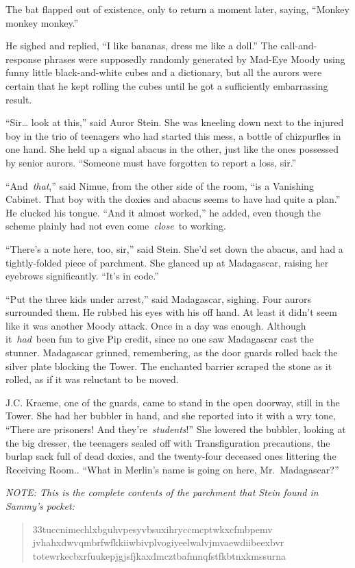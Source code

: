 The bat flapped out of existence, only to return a moment later, saying,
``Monkey monkey monkey.''

He sighed and replied, ``I like bananas, dress me like a doll.'' The
call-and-response phrases were supposedly randomly generated by Mad-Eye
Moody using funny little black-and-white cubes and a dictionary, but all
the aurors were certain that he kept rolling the cubes until he got a
sufficiently embarrassing result.

``Sir\ldots{} look at this,'' said Auror Stein. She was kneeling down
next to the injured boy in the trio of teenagers who had started this
mess, a bottle of chizpurfles in one hand. She held up a signal abacus
in the other, just like the ones possessed by senior aurors. ``Someone
must have forgotten to report a loss, sir.''

``And~\emph{that},'' said Nimue, from the other side of the room, ``is a
Vanishing Cabinet. That boy with the doxies and abacus seems to have had
quite a plan.'' He clucked his tongue. ``And it almost worked,'' he
added, even though the scheme plainly had not even come~\emph{close}~to
working.

``There's a note here, too, sir,'' said Stein. She'd set down the
abacus, and had a tightly-folded piece of parchment. She glanced up at
Madagascar, raising her eyebrows significantly. ``It's in code.''

``Put the three kids under arrest,'' said Madagascar, sighing. Four
aurors surrounded them. He rubbed his eyes with his off hand. At least
it didn't seem like it was another Moody attack. Once in a day was
enough. Although it~\emph{had}~been fun to give Pip credit, since no one
saw Madagascar cast the stunner. Madagascar grinned, remembering, as the
door guards rolled back the silver plate blocking the Tower. The
enchanted barrier scraped the stone as it rolled, as if it was reluctant
to be moved.

J.C. Kraeme, one of the guards, came to stand in the open doorway, still
in the Tower. She had her bubbler in hand, and she reported into it with
a wry tone, ``There are prisoners! And they're~\emph{students}!'' She
lowered the bubbler, looking at the big dresser, the teenagers sealed
off with Transfiguration precautions, the burlap sack full of dead
doxies, and the twenty-four deceased ones littering the Receiving Room..
``What in Merlin's name is going on here, Mr.~Madagascar?''

\mybreak

\emph{NOTE: This is the complete contents of the parchment that Stein
found in Sammy's pocket:}\\

\begin{quote}
\noindent 33tuccnimechlxbguhvpesyvbsuxihryccmcptwkxcfmbpemv
jvhahxdwvqmbrfwfkkiiwbivplvogiyeelwalvjmvaewdiibeexbvr
totewrkecbxrfuukepjgjsfjkaxdmcztbafmnqfstfkbtnxkmssurna
\end{quote}

